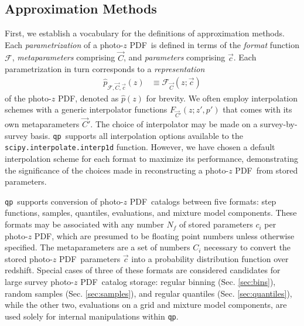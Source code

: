 \documentclass[\docopts]{\docclass}
\newcommand{\qp}{\texttt{qp}}
\newcommand{\pz}{photo-$z$ PDF}
\begin{document}
\subsection{Approximation Methods}
\label{sec:approx}

First, we establish a vocabulary for the definitions of approximation methods.  
Each \textit{parametrization} of a \pz\ is defined in terms of the 
\textit{format} function $\mathcal{F}$, \textit{metaparameters} comprising 
$\vec{C}$, and \textit{parameters} comprising $\vec{c}$.  Each parametrization 
in turn corresponds to a \textit{representation}
\begin{align}
  \label{eq:definition}
  \hat{p}_{\mathcal{F}, \vec{C}, \vec{c}}(z) &\equiv \mathcal{F}_{\vec{C}}(z; 
\vec{c})
\end{align}
of the \pz, denoted as $\hat{p}(z)$ for brevity.  We often employ interpolation 
schemes with a generic interpolator functions $F_{\vec{C}'}(z; z', p')$ that 
comes with its own metaparameters $\vec{C}'$.  The choice of interpolator may 
be made on a survey-by-survey basis.  \qp\ supports all interpolation options 
available to the \texttt{scipy.interpolate.interp1d} function.  However, we 
have chosen a default interpolation scheme for each format to maximize its 
performance, demonstrating the significance of the choices made in 
reconstructing a \pz\ from stored parameters.

\qp\ supports conversion of \pz\ catalogs between five formats: step functions, 
samples, quantiles, evaluations, and mixture model components.  These formats 
may be associated with any number $N_{f}$ of stored parameters $c_{i}$ per \pz, 
which are presumed to be floating point numbers unless otherwise specified.  
The metaparameters are a set of numbers $C_{i}$ necessary to convert the stored 
\pz\ parameters $\vec{c}$ into a probability distribution function over 
redshift.  Special cases of three of these formats are considered candidates 
for large survey \pz\ catalog storage: regular binning (Sec. \ref{sec:bins}), 
random samples (Sec. \ref{sec:samples}), and regular quantiles (Sec. 
\ref{sec:quantiles}), while the other two, evaluations on a grid and mixture 
model components, are used solely for internal manipulations within \qp.
\end{document}
